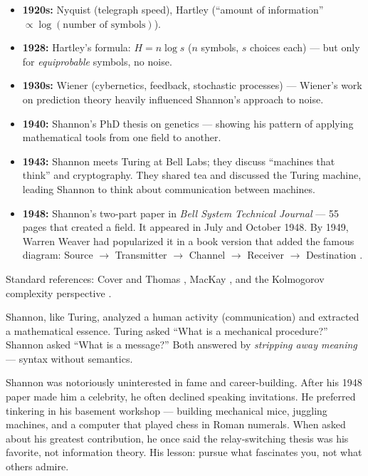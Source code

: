 \begin{itemize}
\item \textbf{1920s:} Nyquist (telegraph speed), Hartley (``amount of information'' $\propto \log(\text{number of symbols})$).
\item \textbf{1928:} Hartley's formula: $H = n \log s$ ($n$ symbols, $s$ choices each) --- but only for \emph{equiprobable} symbols, no noise.
\item \textbf{1930s:} Wiener (cybernetics, feedback, stochastic processes) --- Wiener's work on prediction theory heavily influenced Shannon's approach to noise.
\item \textbf{1940:} Shannon's PhD thesis on genetics --- showing his pattern of applying mathematical tools from one field to another.
\item \textbf{1943:} Shannon meets Turing at Bell Labs; they discuss ``machines that think'' and cryptography. They shared tea and discussed the Turing machine, leading Shannon to think about communication between machines.
\item \textbf{1948:} Shannon's two-part paper in \emph{Bell System Technical Journal} --- 55 pages that created a field. It appeared in July and October 1948. By 1949, Warren Weaver had popularized it in a book version that added the famous diagram: Source $\to$ Transmitter $\to$ Channel $\to$ Receiver $\to$ Destination \cite{Shannon1949}.
\end{itemize}

Standard references: Cover and Thomas \cite{coverthomas2006}, MacKay \cite{MacKay1999}, and the Kolmogorov complexity perspective \cite{kolmogorov1965}.

Shannon, like Turing, analyzed a human activity (communication) and extracted a mathematical essence. Turing asked ``What is a mechanical procedure?'' Shannon asked ``What is a message?'' Both answered by \emph{stripping away meaning} — syntax without semantics.

Shannon was notoriously uninterested in fame and career-building. After his 1948 paper made him a celebrity, he often declined speaking invitations. He preferred tinkering in his basement workshop — building mechanical mice, juggling machines, and a computer that played chess in Roman numerals. When asked about his greatest contribution, he once said the relay-switching thesis was his favorite, not information theory. His lesson: pursue what fascinates you, not what others admire.

